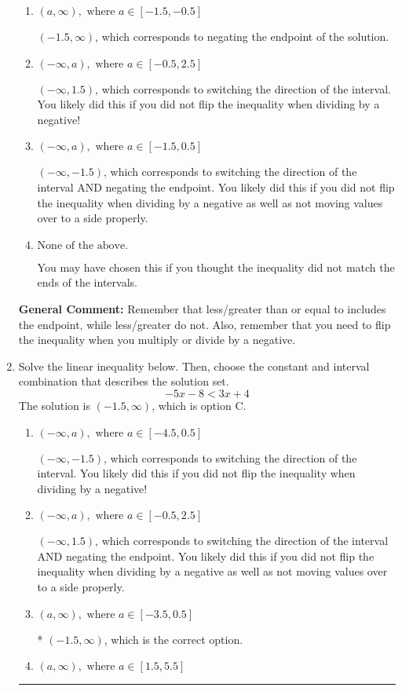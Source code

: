 \documentclass{extbook}[14pt]
\newcommand{\litem}[1]{\item #1

\rule{\textwidth}{0.4pt}}
\begin{document}
\begin{enumerate}
{\begin{enumerate}[label=\Alph*.]
* $(1.5, \infty)$, which is the correct option.
\item \( (a, \infty), \text{ where } a \in [-1.5, -0.5] \)

 $(-1.5, \infty)$, which corresponds to negating the endpoint of the solution.
\item \( (-\infty, a), \text{ where } a \in [-0.5, 2.5] \)

 $(-\infty, 1.5)$, which corresponds to switching the direction of the interval. You likely did this if you did not flip the inequality when dividing by a negative!
\item \( (-\infty, a), \text{ where } a \in [-1.5, 0.5] \)

 $(-\infty, -1.5)$, which corresponds to switching the direction of the interval AND negating the endpoint. You likely did this if you did not flip the inequality when dividing by a negative as well as not moving values over to a side properly.
\item \( \text{None of the above}. \)

You may have chosen this if you thought the inequality did not match the ends of the intervals.
\end{enumerate}

\textbf{General Comment:} Remember that less/greater than or equal to includes the endpoint, while less/greater do not. Also, remember that you need to flip the inequality when you multiply or divide by a negative.
}
\litem{
Solve the linear inequality below. Then, choose the constant and interval combination that describes the solution set.
\[ -5x -8 < 3x + 4 \]The solution is \( (-1.5, \infty) \), which is option C.\begin{enumerate}[label=\Alph*.]
\item \( (-\infty, a), \text{ where } a \in [-4.5, 0.5] \)

 $(-\infty, -1.5)$, which corresponds to switching the direction of the interval. You likely did this if you did not flip the inequality when dividing by a negative!
\item \( (-\infty, a), \text{ where } a \in [-0.5, 2.5] \)

 $(-\infty, 1.5)$, which corresponds to switching the direction of the interval AND negating the endpoint. You likely did this if you did not flip the inequality when dividing by a negative as well as not moving values over to a side properly.
\item \( (a, \infty), \text{ where } a \in [-3.5, 0.5] \)

* $(-1.5, \infty)$, which is the correct option.
\item \( (a, \infty), \text{ where } a \in [1.5, 5.5] \)


\end{enumerate}}
\end{enumerate}
\end{document}
